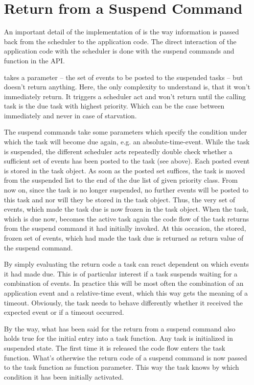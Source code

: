 \section{Return from a Suspend Command}
\label{secReturnFromSuspend}

An important detail of the implementation of \rtos{} is the way
information is passed back from the scheduler to the application code. The
direct interaction of the application code with the scheduler is done with the
suspend commands and function  in the \rtos{} API.

 takes a parameter -- the set of events to be posted to
the suspended tasks -- but doesn't return anything. Here, the only
complexity to understand is, that it won't immediately return. It triggers
a scheduler act and won't return until the calling task is the due task
with highest priority. Which can be the case between immediately and never
in case of starvation.

The suspend commands take some parameters which specify the condition
under which the task will become due again, e.g. an absolute-time-event.
While the task is suspended, the different scheduler acts repeatedly double
check whether a sufficient set of events has been posted to the task (see
above). Each posted event is stored in the task object. As soon as the
posted set suffices, the task is moved from the suspended list to the end
of the due list of given priority class. From now on, since the task is no
longer suspended, no further events will be posted to this task and nor
will they be stored in the task object. Thus, the very set of events, which
made the task due is now frozen in the task object. When the task, which
is due now, becomes the active task again the code flow of the task
returns from the suspend command it had initially invoked. At this
occasion, the stored, frozen set of events, which had made the task due is
returned as return value of the suspend command.

By simply evaluating the return code a task can react dependent on which
events it had made due. This is of particular interest if a task suspends
waiting for a combination of events. In practice this will be most often
the combination of an application event and a relative-time event, which
this way gets the meaning of a timeout. Obviously, the task needs to
behave differently whether it received the expected event or if a timeout
occurred.

By the way, what has been said for the return from a suspend command also
holds true for the initial entry into a task function. Any task is
initialized in suspended state. The first time it is released the code
flow enters the task function. What's otherwise the return code of a
suspend command is now passed to the task function as function parameter.
This way the task knows by which condition it has been initially
activated.

